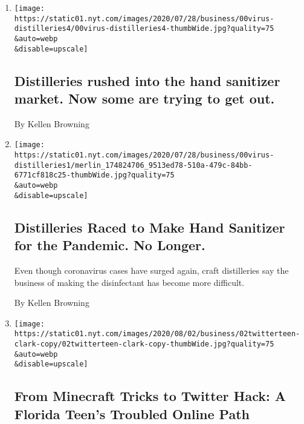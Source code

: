 \begin{enumerate}
\def\labelenumi{\arabic{enumi}.}
\item
  \href{/live/2020/08/04/business/stock-market-today-coronavirus/distilleries-rushed-into-the-hand-sanitizer-market-now-some-are-trying-to-get-out}{}

  \texttt{[image: https://static01.nyt.com/images/2020/07/28/business/00virus-distilleries4/00virus-distilleries4-thumbWide.jpg?quality=75\\\&auto=webp\\\&disable=upscale]}

  \hypertarget{distilleries-rushed-into-the-hand-sanitizer-market-now-some-are-trying-to-get-out}{%
  \subsection{Distilleries rushed into the hand sanitizer market. Now
  some are trying to get
  out.}\label{distilleries-rushed-into-the-hand-sanitizer-market-now-some-are-trying-to-get-out}}

  By Kellen Browning
\item
  \href{/2020/08/04/business/distilleries-hand-sanitizer-pandemic.html}{}

  \texttt{[image: https://static01.nyt.com/images/2020/07/28/business/00virus-distilleries1/merlin\_174824706\_9513ed78-510a-479c-84bb-6771cf818c25-thumbWide.jpg?quality=75\\\&auto=webp\\\&disable=upscale]}

  \hypertarget{distilleries-raced-to-make-hand-sanitizer-for-the-pandemic-no-longer}{%
  \subsection{Distilleries Raced to Make Hand Sanitizer for the
  Pandemic. No
  Longer.}\label{distilleries-raced-to-make-hand-sanitizer-for-the-pandemic-no-longer}}

  Even though coronavirus cases have surged again, craft distilleries
  say the business of making the disinfectant has become more difficult.

  By Kellen Browning
\item
  \href{/2020/08/02/technology/florida-teenager-twitter-hack.html}{}

  \texttt{[image: https://static01.nyt.com/images/2020/08/02/business/02twitterteen-clark-copy/02twitterteen-clark-copy-thumbWide.jpg?quality=75\\\&auto=webp\\\&disable=upscale]}

  \hypertarget{from-minecraft-tricks-to-twitter-hack-a-florida-teens-troubled-online-path}{%
  \subsection{From Minecraft Tricks to Twitter Hack: A Florida Teen's
  Troubled Online
  Path}\label{from-minecraft-tricks-to-twitter-hack-a-florida-teens-troubled-online-path}}


\end{enumerate}
